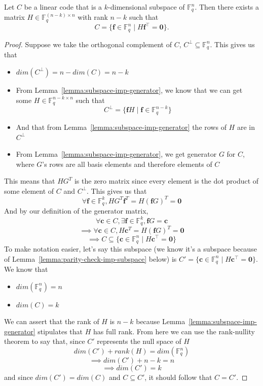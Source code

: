 \begin{lemma}
    \label{lemma:subspace-imp-parity-check}
    Let $C$ be a linear code that is a $k$-dimensional subspace of $\mathbb{F}^{n}_{q}$.
    Then there exists a matrix $H \in \mathbb{F}^{(n-k) \times n}_{q}$ with rank $n-k$ such that
    \[
        C = \{\mathbf{f} \in \mathbb{F}^{n}_{q} \mid H\mathbf{f}^{\intercal} = \mathbf{0}\}.
    \]
\end{lemma}

\begin{proof}
    Suppose we take the orthogonal complement of $C$, $C^{\perp}\subseteq \mathbb{F}^{n}_{q}$. This gives us that
    \begin{itemize}
        \item $dim(C^{\perp})=n-dim(C)=n-k$
        \item From Lemma~\ref{lemma:subspace-imp-generator}, we know that we can get some $H\in \mathbb{F}^{n-k \times n}_{q}$ such that
    \[C^{\perp} = \{\mathbf{f}H \mid \mathbf{f} \in \mathbb{F}^{n-k}_{q}\}\]
        \item And that from Lemma~\ref{lemma:subspace-imp-generator} the rows of $H$ are in $C^{\perp}$
        \item From Lemma~\ref{lemma:subspace-imp-generator}, we get generator $G$ for $C$, where $G$'s rows are all basis elements and therefore elements of $C$
    \end{itemize}
    This means that $HG^T$ is the zero matrix since every element is the dot product of some element of $C$ and $C^{\perp}$. This gives us that
    \[ \forall \mathbf{f}\in \mathbb{F}^k_q, HG^T\mathbf{f}^T = H(\mathbf{f}G)^T = \mathbf{0}\]
    And by our definition of the generator matrix,
    \[\forall \mathbf{c} \in C, \exists \mathbf{f}\in \mathbb{F}^k_q, \mathbf{f}G = \mathbf{c}\]
    \[\implies \forall \mathbf{c} \in C, H\mathbf{c}^T = H(\mathbf{f}G)^T = \mathbf{0}\]
    \[\implies C \subseteq \{\mathbf{c} \in \mathbb{F}^{n}_{q} \mid H\mathbf{c}^{\intercal} = \mathbf{0}\}\]
    To make notation easier, let's say this subspace (we know it's a subspace because of Lemma~\ref{lemma:parity-check-imp-subspace} below) is $C'=\{\mathbf{c} \in \mathbb{F}^{n}_{q} \mid H\mathbf{c}^{\intercal} = \mathbf{0}\}$. We know that
    \begin{itemize}
        \item $dim(\mathbb{F}^{n}_{q})=n$
        \item $dim(C)=k$
    \end{itemize}
    We can assert that the rank of $H$ is $n-k$ because Lemma~\ref{lemma:subspace-imp-generator} stipulates that $H$ has full rank. From here we can use the rank-nullity theorem to say that, since $C'$ represents the null space of $H$
    \[dim(C')+rank(H)=dim(\mathbb{F}^{n}_{q})\]
    \[\implies dim(C') + n-k = n\]
    \[\implies dim(C') = k\]
    and since $dim(C')=dim(C)$ and $C\subseteq C'$, it should follow that $C=C'$.
\end{proof}


